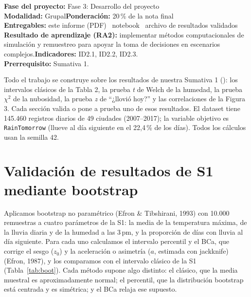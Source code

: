 \documentclass[11pt,a4paper]{article}
\begin{document}
\clearpage
{}
\begin{infobox}
\textbf{Fase del proyecto:} Fase 3: Desarrollo del proyecto\\
\textbf{Modalidad:} Grupal\qquad\textbf{Ponderación:} 20\,\% de la nota final\\
\textbf{Entregables:} este informe (PDF) \textperiodcentered\ notebook  \textperiodcentered\ archivo de resultados validados \\
\textbf{Resultado de aprendizaje (RA2):} implementar métodos computacionales de simulación y remuestreo para apoyar la toma de decisiones en escenarios complejos.\quad\textbf{Indicadores:} ID2.1, ID2.2, ID2.3.\\
\textbf{Prerrequisito:} Sumativa 1.
\end{infobox}
\begin{conexionbox}
Todo el trabajo se construye sobre los resultados de nuestra Sumativa 1 (): los intervalos clásicos de la Tabla 2, la prueba \textit{t} de Welch de la humedad, la prueba $\chi^2$ de la nubosidad, la prueba \textit{z} de ``¿llovió hoy?'' y las correlaciones de la Figura 3. Cada sección valida o pone a prueba uno de esos resultados. El dataset tiene 145.460 registros diarios de 49 ciudades (2007--2017); la variable objetivo es \texttt{RainTomorrow} (llueve al día siguiente en el 22,4\,\% de los días). Todos los cálculos usan la semilla 42.
\end{conexionbox}
\vspace{-0.3em}
{\small\tableofcontents}
\newpage

\section{Validación de resultados de S1 mediante bootstrap}
Aplicamos bootstrap no paramétrico (Efron \& Tibshirani, 1993) con 10.000 remuestras a cuatro parámetros de la S1: la media de la temperatura máxima, de la lluvia diaria y de la humedad a las 3\,pm, y la proporción de días con lluvia al día siguiente. Para cada uno calculamos el intervalo percentil y el BCa, que corrige el sesgo ($z_0$) y la aceleración o asimetría ($a$, estimada con jackknife) (Efron, 1987), y los comparamos con el intervalo clásico de la S1 (Tabla~\ref{tab:boot}). Cada método supone algo distinto: el clásico, que la media muestral es aproximadamente normal; el percentil, que la distribución bootstrap está centrada y es simétrica; y el BCa relaja ese supuesto.
\end{document}
